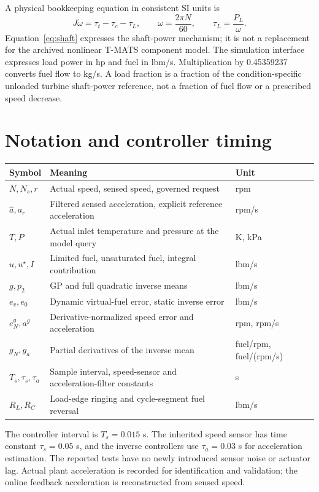 \documentclass[11pt,a4paper,oneside]{report}
\begin{document}
A physical bookkeeping equation in consistent SI units is
\begin{equation}
J\dot\omega=\tau_t-\tau_c-\tau_L,\qquad \omega=\frac{2\pi N}{60},\qquad \tau_L=\frac{P_L}{\omega}.
\label{eq:shaft}
\end{equation}
Equation~\eqref{eq:shaft} expresses the shaft-power mechanism; it is not a replacement for the archived nonlinear T-MATS component model. The simulation interface expresses load power in hp and fuel in lbm/s. Multiplication by 0.45359237 converts fuel flow to kg/s. A load fraction is a fraction of the condition-specific unloaded turbine shaft-power reference, not a fraction of fuel flow or a prescribed speed decrease.

\section{Notation and controller timing}
\begin{longtable}{@{}p{.16\linewidth}p{.54\linewidth}p{.23\linewidth}@{}}
\toprule Symbol & Meaning & Unit\\\midrule
$N,N_s,r$ & Actual speed, sensed speed, governed request & rpm\\
$\hat a,a_r$ & Filtered sensed acceleration, explicit reference acceleration & rpm/s\\
$T,P$ & Actual inlet temperature and pressure at the model query & K, kPa\\
$u,u^\star,I$ & Limited fuel, unsaturated fuel, integral contribution & lbm/s\\
$g,p_2$ & GP and full quadratic inverse means & lbm/s\\
$e_v,e_0$ & Dynamic virtual-fuel error, static inverse error & lbm/s\\
$e_N^g,a^g$ & Derivative-normalized speed error and acceleration & rpm, rpm/s\\
$g_N,g_a$ & Partial derivatives of the inverse mean & fuel/rpm, fuel/(rpm/s)\\
$T_s,\tau_s,\tau_a$ & Sample interval, speed-sensor and acceleration-filter constants & s\\
$R_L,R_C$ & Load-edge ringing and cycle-segment fuel reversal & lbm/s\\
\bottomrule
\end{longtable}
The controller interval is $T_s=0.015$ s. The inherited speed sensor has time constant $\tau_s=0.05$ s, and the inverse controllers use $\tau_a=0.03$ s for acceleration estimation. The reported tests have no newly introduced sensor noise or actuator lag. Actual plant acceleration is recorded for identification and validation; the online feedback acceleration is reconstructed from sensed speed.
\end{document}
